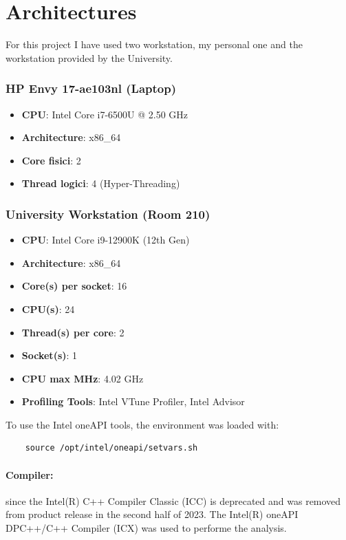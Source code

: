 \section{Architectures}
For this project I have used two workstation, my personal one and the workstation provided by the University.

\subsubsection*{HP Envy 17-ae103nl (Laptop)}
\begin{itemize}
    \item \textbf{CPU}: Intel Core i7-6500U @ 2.50 GHz
    \item \textbf{Architecture}: x86\_64
    \item \textbf{Core fisici}: 2
    \item \textbf{Thread logici}: 4 (Hyper-Threading)
\end{itemize}

\subsubsection*{University Workstation (Room 210)}
\begin{itemize}
    \item \textbf{CPU}: Intel Core i9-12900K (12th Gen)
    \item \textbf{Architecture}: x86\_64
    \item \textbf{Core(s) per socket}: 16
    \item \textbf{CPU(s)}: 24
    \item \textbf{Thread(s) per core}: 2
    \item \textbf{Socket(s)}: 1
    \item \textbf{CPU max MHz}: 4.02 GHz
    \item \textbf{Profiling Tools}: Intel VTune Profiler, Intel Advisor
\end{itemize}

\noindent
To use the Intel oneAPI tools, the environment was loaded with:
\begin{verbatim}
    source /opt/intel/oneapi/setvars.sh
\end{verbatim}

\paragraph{Compiler:} since the Intel(R) C++ Compiler Classic (ICC) is deprecated and was removed from product release in the second half of 2023. The Intel(R) oneAPI DPC++/C++ Compiler (ICX) was used to performe the analysis.